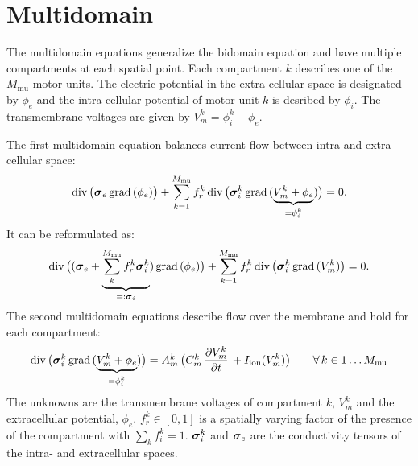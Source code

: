 

\graphicspath{
{images/png/}{images/}{images/plots/}
}



\section{Multidomain}

The multidomain equations generalize the bidomain equation and have multiple compartments at each spatial point. 
Each compartment $k$ describes one of the $M_\text{mu}$ motor units.
The electric potential in the extra-cellular space is designated by $\phi_e$ and the intra-cellular potential of motor unit $k$ is desribed by $\phi_i$. The transmembrane voltages are given by $V_m^k = \phi_i^k - \phi_e$.


The first multidomain equation balances current flow between intra and extra-cellular space:
\begin{equation}\label{eq:multidomain1}
  \begin{array}{lll}
    \div\big(\bfsigma_e\,\grad(\phi_e)\big) + \s{k=1}{M_\text{mu}} f_r^k\,\div\big(\bfsigma_i^k\,\grad(\ub{V_m^k + \phi_e}{=\phi_i^k})\big) = 0.
  \end{array}
\end{equation}
It can be reformulated as:
\begin{equation}\label{eq:multidomain1-1}
  \begin{array}{lll}
    \div\big((\bfsigma_e + \ub{\ds\sum\limits_{k}^{M_\text{mu}} f_r^k\bfsigma_i^k}{=:\bfsigma_i}) \,\grad(\phi_e)\big) + \s{k=1}{M_\text{mu}} f_r^k\,\div\big(\bfsigma_i^k\,\grad(V_m^k )\big) = 0.
  \end{array}
\end{equation}
%
The second multidomain equations describe flow over the membrane and hold for each compartment:
\begin{equation}
  \begin{array}{lll}\label{eq:multidomain2}
    \div\big(\bfsigma_i^k\,\grad(\ub{V_m^k + \phi_e}{=\phi_i^k})\big) = A_m^k\,\big(C_m^k\,\p{V_m^k}{t} + I_\text{ion}(V_m^k)\big) \qquad \forall\,k \in 1\dots M_\text{mu}
  \end{array}
\end{equation}
The unknowns are the transmembrane voltages of compartment $k$, $V_m^k$ and the extracellular potential, $\phi_e$. $f_r^k \in [0,1]$ is a spatially varying factor of the presence of the compartment with $\sum_k f_i^k = 1$.
$\boldsymbol{\sigma}_i^k$ and $\boldsymbol{\sigma}_e$ are the conductivity tensors of the intra- and extracellular spaces.

